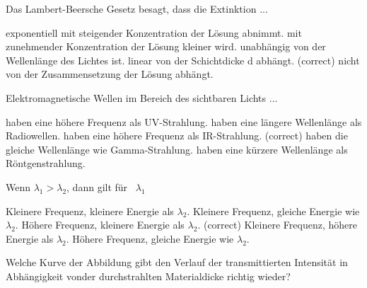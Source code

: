 \documentclass[11pt]{exam}
\begin{document}
\setlength{\voffset}{-0.5in}
\setlength{\headsep}{5pt}

\hspace{2mm}
 \hspace{5mm}
\vspace{4mm}

\begin{questions}

\question Das Lambert-Beersche Gesetz besagt, dass die Extinktion ...

\begin{choices}
	\choice exponentiell mit steigender Konzentration der Lösung abnimmt.
	\choice mit zunehmender Konzentration der Lösung kleiner wird.
	\choice unabhängig von der Wellenlänge des Lichtes ist.
	\choice linear von der Schichtdicke d abhängt. (correct)
	\choice nicht von der Zusammensetzung der Lösung abhängt.
\end{choices}

\vspace{3mm}\question Elektromagnetische Wellen im Bereich des sichtbaren Lichts ...

\begin{choices}
	\choice haben eine höhere Frequenz als UV-Strahlung.
	\choice haben eine längere Wellenlänge als Radiowellen.
	\choice haben eine höhere Frequenz als IR-Strahlung. (correct)
	\choice haben die gleiche Wellenlänge wie Gamma-Strahlung.
	\choice haben eine kürzere Wellenlänge als Röntgenstrahlung.
\end{choices}

\vspace{3mm}\question Wenn \( \lambda_1 > \lambda_2 \), dann gilt für  \( \lambda_1 \)

\begin{choices}
	\choice Kleinere Frequenz, kleinere Energie als \( \lambda_2 \).
	\choice Kleinere Frequenz, gleiche Energie wie \( \lambda_2 \).
	\choice Höhere Frequenz, kleinere Energie als \( \lambda_2 \). (correct)
	\choice Kleinere Frequenz, höhere Energie als \( \lambda_2 \).
	\choice Höhere Frequenz, gleiche Energie wie \( \lambda_2 \).
\end{choices}

\vspace{3mm}\question Welche Kurve der Abbildung gibt den Verlauf der transmittierten Intensität in Abhängigkeit vonder durchstrahlten Materialdicke richtig wieder?


\end{questions}
\end{document}
